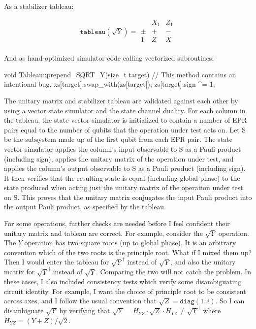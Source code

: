 \documentclass[onecolumn,unpublished]{quantumarticle}
\theoremstyle{definition}
\theoremstyle{definition}
\theoremstyle{definition}
\begin{document}
As a stabilizer tableau:

$$
\texttt{tableau}(\sqrt{Y}) =
\begin{array}{r|cc|cc}
    & X_1 & Z_1   \\
    \hline
    \pm & + & - \\
    1 & Z & X \\
\end{array}
$$

And as hand-optimized simulator code calling vectorized subroutines:

\begin{cpp}
        void Tableau::prepend_SQRT_Y(size_t target) {
            // This method contains an intentional bug.
            xs[target].swap_with(zs[target]);
            zs[target].sign ^= 1;
        }
\end{cpp}

The unitary matrix and stabilizer tableau are validated against each other by using a vector state simulator and the state channel duality.
For each column in the tableau, the state vector simulator is initialized to contain a number of EPR pairs equal to the number of qubits that the operation under test acts on.
Let S be the subsystem made up of the first qubit from each EPR pair.
The state vector simulator applies the column's input observable to S as a Pauli product (including sign), applies the unitary matrix of the operation under test, and applies the column's output observable to S as a Pauli product (including sign).
It then verifies that the resulting state is equal (including global phase) to the state produced when acting just the unitary matrix of the operation under test on S.
This proves that the unitary matrix conjugates the input Pauli product into the output Pauli product, as specified by the tableau.

For some operations, further checks are needed before I feel confident their unitary matrix and tableau are correct.
For example, consider the $\sqrt{Y}$ operation.
The $Y$ operation has two square roots (up to global phase).
It is an arbitrary convention which of the two roots is the principle root.
What if I mixed them up?
Then I would enter the tableau for $\sqrt{Y}^\dagger$ instead of $\sqrt{Y}$, and also the unitary matrix for $\sqrt{Y}^\dagger$ instead of $\sqrt{Y}$.
Comparing the two will not catch the problem.
In these cases, I also included consistency tests which verify some disambiguating circuit identity.
For example, I want the choice of principle root to be consistent across axes, and I follow the usual convention that $\sqrt{Z} = \texttt{diag}(1, i)$.
So I can disambiguate $\sqrt{Y}$ by verifying that $\sqrt{Y} = H_{YZ} \cdot \sqrt{Z} \cdot H_{YZ} \neq \sqrt{Y}^\dagger$ where $H_{YZ} = (Y + Z) / \sqrt{2}$.
\end{document}
